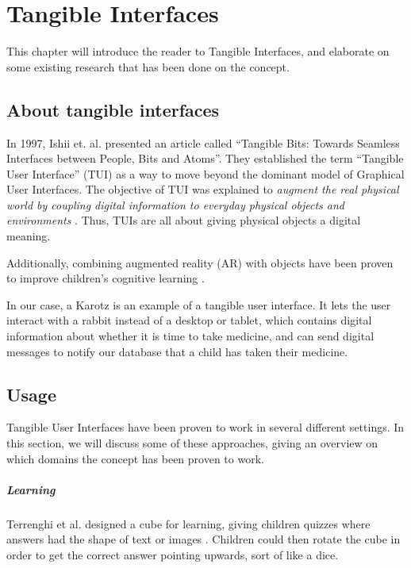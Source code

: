 \chapter{Tangible Interfaces}
\label{chp:tangibleinterfaces}

This chapter will introduce the reader to Tangible Interfaces, and elaborate on some existing research that has been done on the concept.   

\section{About tangible interfaces}

In 1997, Ishii et. al. presented an article called ``Tangible Bits: Towards Seamless Interfaces between People, Bits and Atoms''. They established the term ``Tangible User Interface'' (TUI) as a way to move beyond the dominant model of Graphical User Interfaces. The objective of TUI was explained to \emph{augment the real physical world by coupling digital information to everyday physical objects and environments} \cite{ishii1997tangible}. Thus, TUIs are all about giving physical objects a digital meaning. 

Additionally, combining augmented reality (AR) with objects have been proven to improve children's cognitive learning \cite{zhou2004magic}.   


In our case, a Karotz is an example of a tangible user interface. It lets the user interact with a rabbit instead of a desktop or tablet, which contains digital information about whether it is time to take medicine, and can send digital messages to notify our database that a child has taken their medicine.      


\section{Usage}
Tangible User Interfaces have been proven to work in several different settings. In this section, we will discuss some of these approaches, giving an overview on which domains the concept has been proven to work. 

\paragraph{Learning}
Terrenghi et al. designed a cube for learning, giving children quizzes where answers had the shape of text or images \cite{terrenghi2006cube}. Children could then rotate the cube in order to get the correct answer pointing upwards, sort of like a dice.

